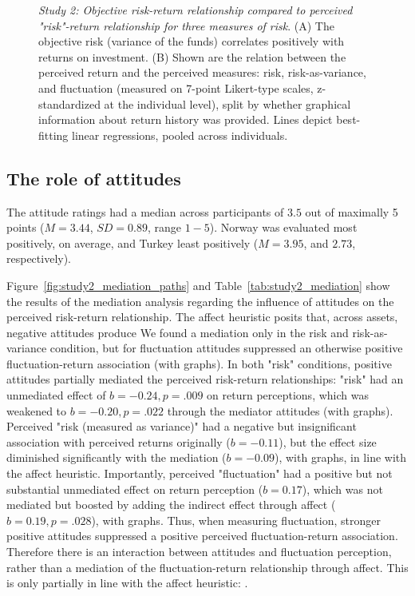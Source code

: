 \documentclass[a4paper,man, natbib,floatsintext]{apa6} %
\begin{document}
%
\begin{figure}[h!] 
 \centering
  \caption{\textit{Study 2: Objective risk-return relationship compared to perceived "risk"-return relationship for three measures of risk}. (A) The objective risk (variance of the funds) correlates positively with returns on investment. (B) Shown are the relation between the perceived return and the perceived measures: risk, risk-as-variance, and fluctuation (measured on 7-point Likert-type scales, z-standardized at the individual level), split by whether graphical information about return history was provided. Lines depict best-fitting linear regressions, pooled across individuals.}
  \label{fig:study2_rrc}
\end{figure}
%

\clearpage

\subsection{The role of attitudes}
The attitude ratings had a median across participants of $3.5$ out of maximally 5 points ($M=3.44$, $SD=0.89$, range $1-5$). Norway was evaluated most positively, on average, and Turkey least positively ($M=3.95$, and $2.73$, respectively).

Figure~\ref{fig:study2_mediation_paths} and Table~\ref{tab:study2_mediation} show the results of the mediation analysis regarding the influence of attitudes on the perceived risk-return relationship. The affect heuristic \citep{Finucane2000} posits that, across assets, negative attitudes produce  We found a mediation only in the risk and risk-as-variance condition, but for fluctuation attitudes suppressed an otherwise positive fluctuation-return association (with graphs). In both "risk" conditions, positive attitudes partially mediated the perceived risk-return relationships: "risk" had an unmediated effect of $b=-0.24, p=.009$ on return perceptions, which was weakened to $b=-0.20, p=.022$ through the mediator attitudes (with graphs). Perceived "risk (measured as variance)" had a negative but insignificant association with perceived returns originally ($b=-0.11$), but the effect size diminished significantly with the mediation ($b=−0.09$), with graphs, in line with the affect heuristic. Importantly, perceived "fluctuation" had a positive but not substantial unmediated effect on return perception ($b=0.17$), which was not mediated but boosted by adding the indirect effect through affect ($b=0.19, p=.028$), with graphs. Thus, when measuring fluctuation, stronger positive attitudes suppressed a positive perceived fluctuation-return association. Therefore there is an interaction between attitudes and fluctuation perception, rather than a mediation of the fluctuation-return relationship through affect. This is only partially in line with the affect heuristic: .
\end{document}
